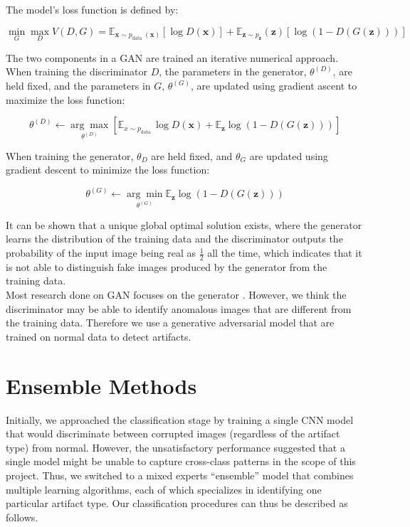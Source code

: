 \noindent The model's loss function is defined by:

$$
\min _{G} \max _{D} V(D, G)=\mathbb{E}_{\boldsymbol{x} \sim p_{\text {data }}(\boldsymbol{x})}[\log D(\boldsymbol{x})]+\mathbb{E}_{\boldsymbol{z} \sim p_{\boldsymbol{z}}}(\boldsymbol{z})[\log (1-D(G(\boldsymbol{z})))]
$$

\noindent The two components in a GAN are trained an iterative numerical approach. When training the discriminator $D$, the parameters in the generator, $\theta^{(D)}$, are held fixed, and the parameters in $G$, $\theta^{(G)}$, are updated using gradient ascent to maximize the loss function:

$$\theta^{(D)} \leftarrow \underset{\theta^{(D)}}{\arg \max }\left[ \mathbb{E}_{x \sim p_{\text {data }}} \log D(\mathbf{x})+ \mathbb{E}_{\mathbf{z}} \log (1-D(G(\mathbf{z})))\right]$$

\noindent When training the generator, $\theta_D$ are held fixed, and $\theta_G$ are updated using gradient descent to minimize the loss function:

$$\theta^{(G)} \leftarrow \underset{\theta^{(G)}}{\arg \min }  \mathbb{E}_{\mathbf{z}} \log (1-D(G(\mathbf{z})))$$

\noindent It can be shown that a unique global optimal solution exists, where the generator learns the distribution of the training data and the discriminator outputs the probability of the input image being real as $\frac{1}{2}$ all the time, which indicates that it is not able to distinguish fake images produced by the generator from the training data.\\


\noindent Most research done on GAN focuses on the generator \cite{style_gan}. However, we think the discriminator may be able to identify anomalous images that are different from the training data. Therefore we use a generative adversarial model that are trained on normal data to detect artifacts.
\newpage
\section{Ensemble Methods}
Initially, we approached the classification stage by training a single CNN model that would discriminate between corrupted images (regardless of the artifact type) from normal. However, the unsatisfactory performance suggested that a single model might be unable to capture cross-class patterns in the scope of this project. Thus, we switched to a mixed experts ``ensemble'' model that combines multiple learning algorithms, each of which specializes in identifying one particular artifact type. Our classification procedures can thus be described as follows.

